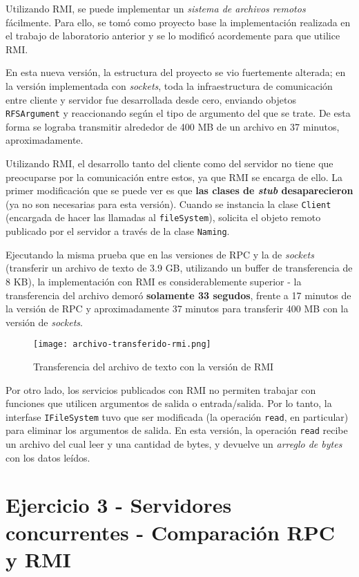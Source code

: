 Utilizando RMI, se puede implementar un \emph{sistema de archivos remotos} fácilmente. Para ello, se tomó como proyecto base la implementación realizada en el trabajo de laboratorio anterior y se lo modificó acordemente para que utilice RMI.

En esta nueva versión, la estructura del proyecto se vio fuertemente alterada; en la versión implementada con \emph{sockets}, toda la infraestructura de comunicación entre cliente y servidor fue desarrollada desde cero, enviando objetos \texttt{RFSArgument} y reaccionando según el tipo de argumento del que se trate. De esta forma se lograba transmitir alrededor de 400 MB de un archivo en 37 minutos, aproximadamente.

Utilizando RMI, el desarrollo tanto del cliente como del servidor no tiene que preocuparse por la comunicación entre estos, ya que RMI se encarga de ello. La primer modificación que se puede ver es que \textbf{las clases de \emph{stub} desaparecieron} (ya no son necesarias para esta versión). Cuando se instancia la clase \texttt{Client} (encargada de hacer las llamadas al \texttt{fileSystem}), solicita el objeto remoto publicado por el servidor a través de la clase \texttt{Naming}.

Ejecutando la misma prueba que en las versiones de RPC y la de \emph{sockets} (transferir un archivo de texto de 3.9 GB, utilizando un buffer de transferencia de 8 KB), la implementación con RMI es considerablemente superior - la transferencia del archivo demoró \textbf{solamente 33 segudos}, frente a 17 minutos de la versión de RPC y aproximadamente 37 minutos para transferir 400 MB con la versión de \emph{sockets}.

\begin{figure}[H]
    \centering
    \texttt{[image: archivo-transferido-rmi.png]}
    \caption{Transferencia del archivo de texto con la versión de RMI}
\end{figure}

Por otro lado, los servicios publicados con RMI no permiten trabajar con funciones que utilicen argumentos de salida o entrada/salida. Por lo tanto, la interfase \texttt{IFileSystem} tuvo que ser modificada (la operación \texttt{read}, en particular) para eliminar los argumentos de salida. En esta versión, la operación \texttt{read} recibe un archivo del cual leer y una cantidad de bytes, y devuelve un \emph{arreglo de bytes} con los datos leídos.   


\section{Ejercicio 3 - Servidores concurrentes - Comparación RPC y RMI}

